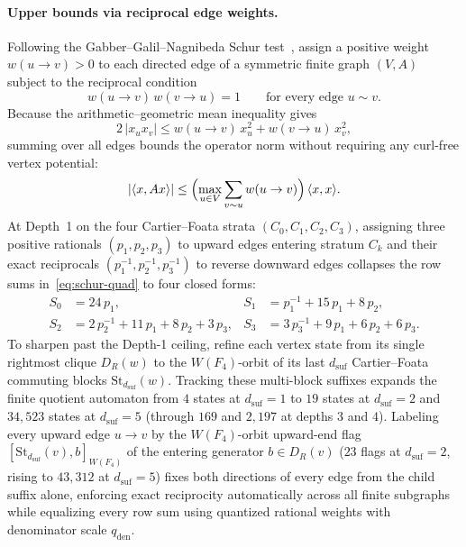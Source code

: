 \paragraph{Upper bounds via reciprocal edge weights.}
Following the Gabber--Galil--Nagnibeda Schur test~\cite{nagnibeda1997}, assign a positive weight $w(u \to v) > 0$ to each directed edge of a symmetric finite graph $(V, A)$ subject to the reciprocal condition
\begin{equation}
\label{eq:reciprocal-schur}
w(u \to v)\,w(v \to u) = 1 \qquad \text{for every edge } u \sim v.
\end{equation}
Because the arithmetic--geometric mean inequality gives
\begin{equation}
\label{eq:ag-mean}
2\,|x_u x_v| \le w(u \to v)\,x_u^2 + w(v \to u)\,x_v^2,
\end{equation}
summing over all edges bounds the operator norm without requiring any curl-free vertex potential:
\begin{equation}
\label{eq:schur-quad}
|\langle x, A x \rangle| \le \Bigl(\max_{u \in V} \sum_{v \sim u} w(u \to v)\Bigr)\,\langle x, x \rangle.
\end{equation}
At Depth~1 on the four Cartier--Foata strata $(C_0, C_1, C_2, C_3)$, assigning three positive rationals $(p_1, p_2, p_3)$ to upward edges entering stratum $C_k$ and their exact reciprocals $(p_1^{-1}, p_2^{-1}, p_3^{-1})$ to reverse downward edges collapses the row sums in~\eqref{eq:schur-quad} to four closed forms:
\begin{align}
S_0 &= 24\,p_1, & S_1 &= p_1^{-1} + 15\,p_1 + 8\,p_2, \label{eq:schur-s01}\\
S_2 &= 2\,p_2^{-1} + 11\,p_1 + 8\,p_2 + 3\,p_3, & S_3 &= 3\,p_3^{-1} + 9\,p_1 + 6\,p_2 + 6\,p_3. \label{eq:schur-s23}
\end{align}
To sharpen past the Depth-1 ceiling, refine each vertex state from its single rightmost clique $D_R(w)$ to the $W(F_4)$-orbit of its last $d_{\mathrm{suf}}$ Cartier--Foata commuting blocks $\mathrm{St}_{d_{\mathrm{suf}}}(w)$. Tracking these multi-block suffixes expands the finite quotient automaton from $4$ states at $d_{\mathrm{suf}} = 1$ to $19$ states at $d_{\mathrm{suf}} = 2$ and $34{,}523$ states at $d_{\mathrm{suf}} = 5$ (through $169$ and $2{,}197$ at depths $3$ and $4$). Labeling every upward edge $u \to v$ by the $W(F_4)$-orbit upward-end flag $[\mathrm{St}_{d_{\mathrm{suf}}}(v), b]_{W(F_4)}$ of the entering generator $b \in D_R(v)$ ($23$ flags at $d_{\mathrm{suf}} = 2$, rising to $43{,}312$ at $d_{\mathrm{suf}} = 5$) fixes both directions of every edge from the child suffix alone, enforcing exact reciprocity automatically across all finite subgraphs while equalizing every row sum using quantized rational weights with denominator scale $q_{\mathrm{den}}$.

